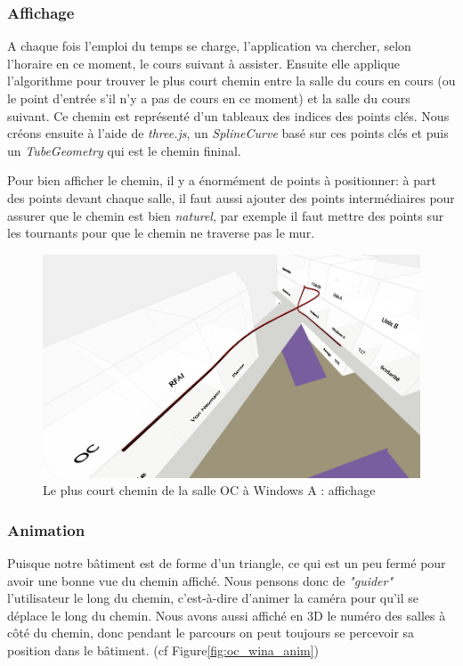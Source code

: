 \documentclass[twoside]{EPURapport}
\begin{document}
\subsubsection{Affichage}
A chaque fois l'emploi du temps se charge, l'application va chercher, selon l'horaire en ce moment, le cours suivant à assister. Ensuite elle applique l'algorithme pour trouver le plus court chemin entre la salle du cours en cours (ou le point d'entrée s'il n'y a pas de cours en ce moment) et la salle du cours suivant. Ce chemin est représenté d'un tableaux des indices des points clés. Nous créons ensuite à l'aide de \textit{three.js}, un \textit{SplineCurve} basé sur ces points clés et puis un \textit{TubeGeometry} qui est le chemin fininal.


Pour bien afficher le chemin, il y a énormément de points à positionner: à part des points devant chaque salle, il faut aussi ajouter des points intermédiaires pour assurer que le chemin est bien \textit{naturel}, par exemple il faut mettre des points sur les tournants pour que le chemin ne traverse pas le mur.


\begin{figure}[!htbp]
	\centering
		\includegraphics[scale=0.5]{img/oc_wina.png}
	\caption{Le plus court chemin de la salle OC à Windows A : affichage}
	\label{fig:oc_wina}
\end{figure}
\bigskip

\subsubsection{Animation}
Puisque notre bâtiment est de forme d'un triangle, ce qui est un peu fermé pour avoir une bonne vue du chemin affiché. Nous pensons donc de \textit{"guider"} l'utilisateur le long du chemin, c'est-à-dire d'animer la caméra pour qu'il se déplace le long du chemin. Nous avons aussi affiché en 3D le numéro des salles à côté du chemin, donc pendant le parcours on peut toujours se percevoir sa position dans le bâtiment. (cf Figure\ref{fig:oc_wina_anim})
\end{document}

